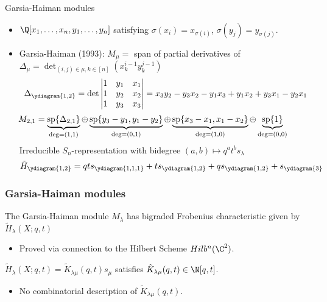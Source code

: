 \documentclass[dvipsnames]{beamer}
\renewcommand{\Span}{\operatorname{sp}}
\theoremstyle{definition}
\begin{document}
\begin{frame}{Garsia-Haiman modules}
  \begin{itemize}
  \item \(\Q[x_1,\ldots,x_n,y_1,\ldots,y_n]\) satisfying
    \(\sigma(x_i) = x_{\sigma(i)}\), \(\sigma(y_j) = y_{\sigma(j)}\).\pause
  \item Garsia-Haiman (1993): \(M_\mu = \) span of partial derivatives of
    \(\Delta_\mu = \det_{(i,j) \in \mu, k \in [n]} (x_k^{i-1} y_k^{j-1})\) \pause \[
      \Delta_{\ydiagram{1,2}} = \det \left|
        \begin{matrix}
          1 & y_1 & x_1 \\
          1 & y_2 & x_2 \\
          1 & y_3 & x_3
        \end{matrix}
      \right| = x_3 y_2 - y_3 x_2 - y_1 x_3 + y_1 x_2 + y_3 x_1 - y_2 x_1
    \]
    \pause
  \[
    \hspace{-3em}
      M_{2,1} = \underbrace{\Span\{\Delta_{2,1}\}}_{\deg = (1,1)}
      \oplus \underbrace{\Span\{y_3-y_1, y_1 - y_2\}}_{\deg = (0,1)}
      \oplus \underbrace{\Span\{x_3-x_1, x_1 - x_2\}}_{\deg = (1,0)}
      \oplus \underbrace{\Span \{1\}}_{\deg = (0,0)}
    \]
    \pause
    Irreducible \(S_n\)-representation with bidegree \((a,b) \mapsto
    q^at^b s_\lambda\) \pause \[
      \tilde{H}_{\ydiagram{1,2}} = qt s_{\ydiagram{1,1,1}} + t
      s_{\ydiagram{1,2}} + q s_{\ydiagram{1,2}} + s_{\ydiagram{3}}
    \]
  \end{itemize}
\end{frame}
\begin{frame}
  \frametitle{Garsia-Haiman modules}
  \begin{theorem}[Haiman, 2001]
    The Garsia-Haiman module \(M_\lambda\) has bigraded Frobenius
    characteristic given by \(\tilde{H}_\lambda(X;q,t)\)
  \end{theorem}\pause
  \begin{itemize}
  \item Proved via connection to the Hilbert Scheme \(Hilb^n(\C^2)\).\pause
  \end{itemize}
  \begin{corollary}
    \(\tilde{H}_\lambda(X;q,t) = \tilde{K}_{\lambda \mu}(q,t) s_\mu\)
    satisfies \(\tilde{K}_{\lambda \mu}(q,t) \in \N[q,t]\).
  \end{corollary}\pause
  \begin{itemize}
  \item No combinatorial description of \(\tilde{K}_{\lambda \mu}(q,t)\).
  \end{itemize}
  \end{frame}
\end{document}
